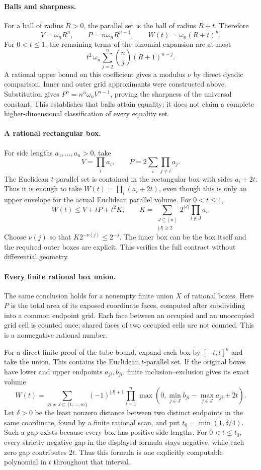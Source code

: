 \paragraph{Balls and sharpness.}
For a ball of radius \(R>0\), the parallel set is the ball of radius
\(R+t\). Therefore
\[
 V=\omega_nR^n,\qquad P=n\omega_nR^{n-1},\qquad
 W(t)=\omega_n(R+t)^n.
\]
For \(0<t\leq1\), the remaining terms of the binomial expansion are
at most
\[
 t^2\,\omega_n\sum_{j=2}^n\binom nj(R+1)^{n-j}.
\]
A rational upper bound on this coefficient gives a modulus \(\nu\)
by direct dyadic comparison. Inner and outer grid approximants were
constructed above. Substitution gives
\(P^n=n^n\omega_nV^{n-1}\), proving the sharpness of the universal
constant. This establishes that balls attain equality; it does not claim
a complete higher-dimensional classification of every equality set.

\paragraph{A rational rectangular box.}
For side lengths \(a_1,\ldots,a_n>0\), take
\[
 V=\prod_i a_i,\qquad P=2\sum_i\prod_{j\ne i}a_j.
\]
The Euclidean \(t\)-parallel set is contained in the rectangular box
with sides \(a_i+2t\). Thus it is enough to take
\(W(t)=\prod_i(a_i+2t)\), even though this is only an upper envelope
for the actual Euclidean parallel volume. For \(0<t\leq1\),
\[
 W(t)\leq V+tP+t^2K,\qquad
 K=\sum_{\substack{J\subseteq[n]\\|J|\geq2}}
 2^{|J|}\prod_{i\notin J}a_i.
\]
Choose \(\nu(j)\) so that \(K2^{-\nu(j)}\leq2^{-j}\).
The inner box can be the box itself and the required outer boxes are
explicit. This verifies the full contract without differential geometry.

\paragraph{Every finite rational box union.}
The same conclusion holds for a nonempty finite union \(X\) of rational
boxes. Here \(P\) is the total area of its exposed coordinate faces,
computed after subdividing into a common endpoint grid. Each face between
an occupied and an unoccupied grid cell is counted once; shared faces of
two occupied cells are not counted. This is a nonnegative rational number.

For a direct finite proof of the tube bound, expand each box by
\([-t,t]^n\) and take the union. This contains the Euclidean
\(t\)-parallel set. If the original boxes have lower and upper endpoints
\(a_{ji},b_{ji}\), finite inclusion--exclusion gives its exact volume
\[
 W(t)=\sum_{\varnothing\ne J\subseteq\{1,\ldots,m\}}
 (-1)^{|J|+1}
 \prod_{i=1}^n
 \max\!\left(0,\min_{j\in J}b_{ji}-\max_{j\in J}a_{ji}+2t\right).
\]
Let \(\delta>0\) be the least nonzero distance between two distinct
endpoints in the same coordinate, found by a finite rational scan, and
put \(t_0=\min(1,\delta/4)\). Such a gap exists because every box has
positive side lengths. For \(0<t\leq t_0\), every strictly negative
gap in the displayed formula stays negative, while each zero gap
contributes \(2t\). Thus this formula is one explicitly computable
polynomial in \(t\) throughout that interval.

